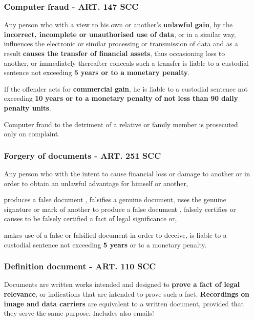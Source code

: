 \subsubsection{Computer fraud - ART. 147 SCC}
\begin{compactenum}
	\item Any person who with a view to his own or another's \textbf{unlawful gain}, by the \textbf{incorrect, incomplete or unauthorised use of data}, or in a similar way, influences the electronic or similar processing or transmission of data and as a result \textbf{causes the transfer of financial assets}, thus occasioning loss to another, or immediately thereafter conceals such a transfer is liable to a custodial sentence not exceeding \textbf{5 years or to a monetary penalty}.
	\item If the offender acts for \textbf{commercial gain}, he is liable to a custodial sentence not exceeding \textbf{10 years or to a monetary penalty of not less than 90 daily penalty units}.
	\item Computer fraud to the detriment of a relative or family member is prosecuted only on complaint.
\end{compactenum}

\subsubsection{Forgery of documents - ART. 251 SCC}
Any person who with the intent to cause financial loss or damage to another or in order to obtain an unlawful advantage for himself or another,
\begin{compactitem}
	\item produces a false document , falsifies a genuine document, uses the genuine signature or mark of another to produce a false document , falsely certifies or causes to be falsely certified a fact of legal significance or,
	\item makes use of a false or falsified document in order to deceive, is liable to a custodial sentence not exceeding \textbf{5 years} or to a monetary penalty.
\end{compactitem}

\subsubsection{Definition document - ART. 110 SCC}
Documents are written works intended and designed to \textbf{prove a fact of legal relevance}, or indications that are intended to prove such a fact.\textbf{ Recordings on image and data carriers} are equivalent to a written document, provided that they serve the same purpose. Includes also emails!


